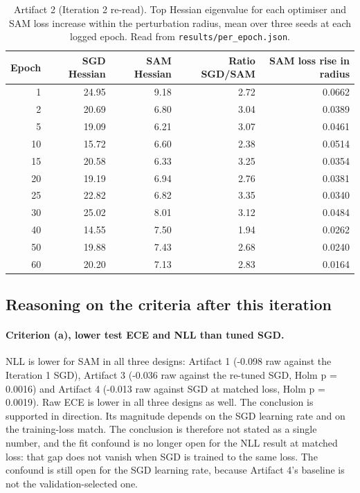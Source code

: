 \documentclass[11pt,letterpaper]{article}
\begin{document}
\begin{table}[!htbp]
\centering
\footnotesize
\caption{Artifact 2 (Iteration 2 re-read). Top Hessian eigenvalue for each optimiser and SAM loss increase within the perturbation radius, mean over three seeds at each logged epoch. Read from \texttt{results/per\_epoch.json}.}
\label{tab:hessian}
\begin{tabular}{rrrrr}
\toprule
Epoch & SGD Hessian & SAM Hessian & Ratio SGD/SAM & SAM loss rise in radius \\
\midrule
1 & 24.95 & 9.18 & 2.72 & 0.0662 \\
2 & 20.69 & 6.80 & 3.04 & 0.0389 \\
5 & 19.09 & 6.21 & 3.07 & 0.0461 \\
10 & 15.72 & 6.60 & 2.38 & 0.0514 \\
15 & 20.58 & 6.33 & 3.25 & 0.0354 \\
20 & 19.19 & 6.94 & 2.76 & 0.0381 \\
25 & 22.82 & 6.82 & 3.35 & 0.0340 \\
30 & 25.02 & 8.01 & 3.12 & 0.0484 \\
40 & 14.55 & 7.50 & 1.94 & 0.0262 \\
50 & 19.88 & 7.43 & 2.68 & 0.0240 \\
60 & 20.20 & 7.13 & 2.83 & 0.0164 \\
\bottomrule
\end{tabular}
\end{table}

\subsection{Reasoning on the criteria after this iteration}

\paragraph{Criterion (a), lower test ECE and NLL than tuned SGD.} NLL is lower for SAM in all three designs: Artifact 1 (-0.098 raw against the Iteration 1 SGD), Artifact 3 (-0.036 raw against the re-tuned SGD, Holm p = 0.0016) and Artifact 4 (-0.013 raw against SGD at matched loss, Holm p = 0.0019). Raw ECE is lower in all three designs as well. The conclusion is supported in direction. Its magnitude depends on the SGD learning rate and on the training-loss match. The conclusion is therefore not stated as a single number, and the fit confound is no longer open for the NLL result at matched loss: that gap does not vanish when SGD is trained to the same loss. The confound is still open for the SGD learning rate, because Artifact 4's baseline is not the validation-selected one.
\end{document}
